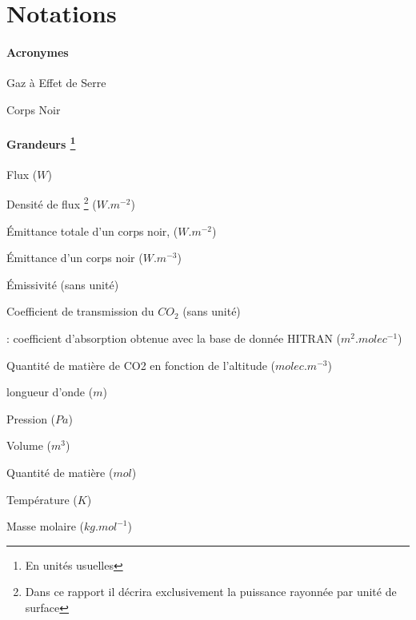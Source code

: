 \documentclass[a4paper, 12pt]{report} %
\begin{document}
\vfill


\newpage
\pagestyle{courant} 
	\setcounter{tocdepth}{2} %
	\tableofcontents %


\newpage
\chapter*{Notations} 

\begin{description}
	\subsubsection*{Acronymes}
	\item[GES:] Gaz à Effet de Serre
    \item[CN:] Corps Noir
    
	\subsubsection*{Grandeurs \footnote{En unités usuelles}}
    \item[\boldmath{$\Phi$}:] Flux  ($W$)
    \item[\boldmath{$\phi$}:] Densité de flux \footnote{Dans ce rapport il décrira exclusivement la puissance rayonnée par unité de surface} ($W.m^{-2}$)
    \item[\boldmath{$M^{0}$}:] Émittance totale d'un corps noir, ($W.m^{-2}$)
    \item[\boldmath{$M^{0}_{\lambda,T}$}:] Émittance d'un corps noir ($W.m^{-3}$)
    \item[\boldmath{$\epsilon$}:] Émissivité (sans unité)
    \item[\boldmath{$\tau_{CO_2}$}:] Coefficient de transmission du $CO_2$ (sans unité)
	\item[\boldmath{$k_{abs}$}:]: coefficient d'absorption obtenue avec la base de donnée HITRAN ($m^2.molec^{-1}$)
     \item[\boldmath{$n_{CO2}(z)$}:] Quantité de matière de CO2 en fonction de l'altitude ($molec.m^{-3}$)
    \item[\boldmath{$\lambda$}:] longueur d'onde ($m$)
    \item[\boldmath{$P$}:] Pression ($Pa$)
    \item[\boldmath{$V$}:] Volume ($m^3$)
	\item[\boldmath{$n$}:] Quantité de matière ($mol$)
	\item[\boldmath{$T$}:] Température ($K$)
 	\item[\boldmath{$M$}:] Masse molaire ($kg.mol^{-1}$)
	

\end{description}
\end{document}
